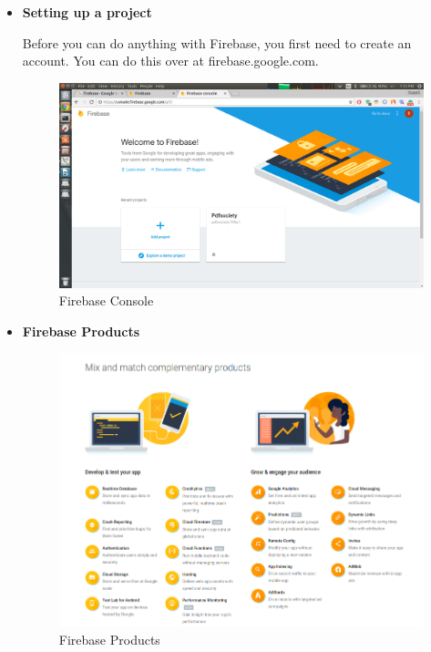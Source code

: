 \begin{itemize}

\item \textbf{Setting up a project}

Before you can do anything with Firebase, you first need to create an account. You can do this over at firebase.google.com.

\begin{figure}[ht]
\centering
\includegraphics[scale=0.20]{images/Pdf2.png}
\caption{Firebase Console}
\end{figure}

 

\item \textbf{Firebase Products}

\begin{figure}[ht]
\centering
\includegraphics[scale=0.4]{images/Pdf1.png}
\caption{Firebase Products}
\end{figure}


\end{itemize}
